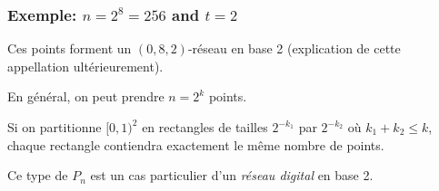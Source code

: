 \documentclass[t,usepdftitle=false]{beamer}
\begin{document}
\begin{frame}[fragile]
\frametitle{Exemple: $n = 2^{8} = 256$ and $t=2$}

Ces points forment un $(0,8,2)$-r\'eseau en base 2 (explication de
cette appellation ultérieurement).

\mbox{}

En g\'en\'eral, on peut prendre ${n = 2^k}$ points.

\mbox{}

Si on partitionne $[0,1)^2$ en rectangles de tailles $2^{-k_1}$ par $2^{-k_2}$
o\`u $k_1 + k_2 \le k$, chaque rectangle contiendra exactement le m\^eme
nombre de points.

\mbox{}

Ce type de $P_n$ est un cas particulier d'un \emph{r\'eseau digital} en base 2.

\end{frame}
\end{document}
